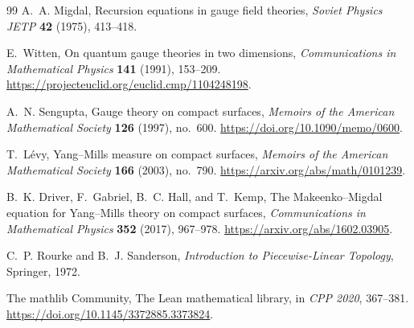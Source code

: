 \documentclass[11pt]{article}
\theoremstyle{remark}
\begin{document}
\begin{thebibliography}{99}
A.~A. Migdal,
\newblock Recursion equations in gauge field theories,
\newblock \emph{Soviet Physics JETP} \textbf{42} (1975), 413--418.

E.~Witten,
\newblock On quantum gauge theories in two dimensions,
\newblock \emph{Communications in Mathematical Physics} \textbf{141} (1991),
153--209. \url{https://projecteuclid.org/euclid.cmp/1104248198}.

A.~N. Sengupta,
\newblock Gauge theory on compact surfaces,
\newblock \emph{Memoirs of the American Mathematical Society} \textbf{126}
(1997), no.~600. \url{https://doi.org/10.1090/memo/0600}.

T.~L\'evy,
\newblock Yang--Mills measure on compact surfaces,
\newblock \emph{Memoirs of the American Mathematical Society} \textbf{166}
(2003), no.~790. \url{https://arxiv.org/abs/math/0101239}.

B.~K. Driver, F.~Gabriel, B.~C. Hall, and T.~Kemp,
\newblock The Makeenko--Migdal equation for Yang--Mills theory on compact
surfaces,
\newblock \emph{Communications in Mathematical Physics} \textbf{352} (2017),
967--978. \url{https://arxiv.org/abs/1602.03905}.

C.~P. Rourke and B.~J. Sanderson,
\newblock \emph{Introduction to Piecewise-Linear Topology},
\newblock Springer, 1972.

The mathlib Community,
\newblock The Lean mathematical library,
\newblock in \emph{CPP 2020}, 367--381.
\url{https://doi.org/10.1145/3372885.3373824}.
\end{thebibliography}
\end{document}
